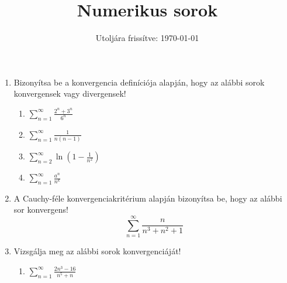 \documentclass[a4paper, 12pt]{scrartcl}
\title{Numerikus sorok}
\date{Utoljára frissítve: \today}
\begin{document}
\maketitle



\vfill

\begin{enumerate}
  \item Bizonyítsa be a konvergencia definíciója alapján, hogy az alábbi sorok
        konvergensek vagy divergensek!
        \begin{multicols}{2}
          \begin{enumerate}
            \item $\displaystyle
                    \sum_{n = 1}^\infty \frac{2^n + 3^n}{6^n}
                  $

            \item $\displaystyle
                    \sum_{n = 1}^\infty \frac{1}{n (n - 1)}
                  $

            \item $\displaystyle
                    \sum_{n = 2}^\infty \ln \left( 1 - \frac{1}{n^2} \right)
                  $

            \item $\displaystyle
                    \sum_{n = 1}^\infty \frac{a^n}{n^k}
                  $
          \end{enumerate}
        \end{multicols}

  \item A Cauchy-féle konvergenciakritérium alapján bizonyítsa be, hogy az
        alábbi sor konvergens!
        \[
          \sum_{n = 1}^\infty \frac{n}{n^3 + n^2 + 1}
        \]

  \item Vizsgálja meg az alábbi sorok konvergenciáját!
        \begin{multicols}{3}
          \begin{enumerate}
            \item $\displaystyle
                    \sum_{n = 1}^\infty \frac{2n^3 - 16}{n^5 + n}
                  $


\end{enumerate}
\end{multicols}
\end{enumerate}
\end{document}
